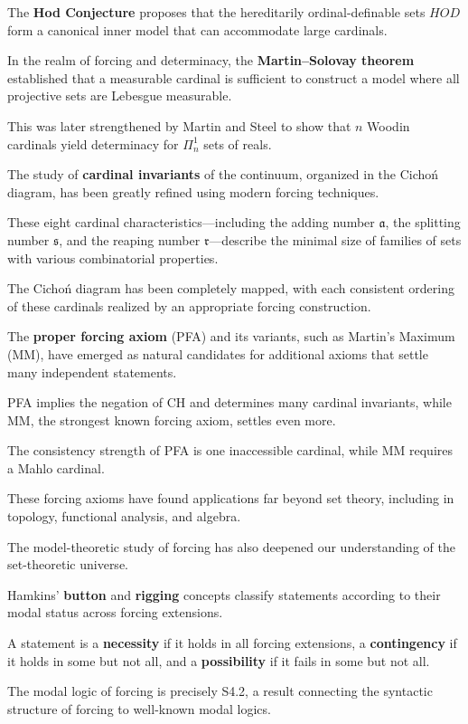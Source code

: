 The \textbf{Hod Conjecture} proposes that the hereditarily ordinal-definable sets $HOD$ form a canonical inner model that can accommodate large cardinals.

In the realm of forcing and determinacy, the \textbf{Martin--Solovay theorem} established that a measurable cardinal is sufficient to construct a model where all projective sets are Lebesgue measurable.

This was later strengthened by Martin and Steel to show that $n$ Woodin cardinals yield determinacy for $\Pi^1_n$ sets of reals.

The study of \textbf{cardinal invariants} of the continuum, organized in the Cichoń diagram, has been greatly refined using modern forcing techniques.

These eight cardinal characteristics---including the adding number $\mathfrak{a}$, the splitting number $\mathfrak{s}$, and the reaping number $\mathfrak{r}$---describe the minimal size of families of sets with various combinatorial properties.

The Cichoń diagram has been completely mapped, with each consistent ordering of these cardinals realized by an appropriate forcing construction.

The \textbf{proper forcing axiom} (PFA) and its variants, such as Martin's Maximum (MM), have emerged as natural candidates for additional axioms that settle many independent statements.

PFA implies the negation of CH and determines many cardinal invariants, while MM, the strongest known forcing axiom, settles even more.

The consistency strength of PFA is one inaccessible cardinal, while MM requires a Mahlo cardinal.

These forcing axioms have found applications far beyond set theory, including in topology, functional analysis, and algebra.

The model-theoretic study of forcing has also deepened our understanding of the set-theoretic universe.

Hamkins' \textbf{button} and \textbf{rigging} concepts classify statements according to their modal status across forcing extensions.

A statement is a \textbf{necessity} if it holds in all forcing extensions, a \textbf{contingency} if it holds in some but not all, and a \textbf{possibility} if it fails in some but not all.

The modal logic of forcing is precisely S4.2, a result connecting the syntactic structure of forcing to well-known modal logics.

